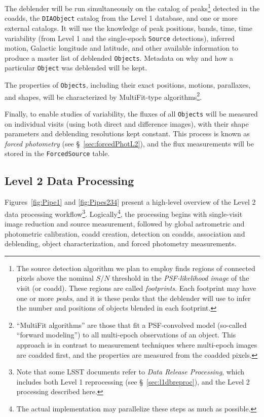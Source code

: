\documentclass[12pt]{article}
\newcommand{\code}[1]{\texttt{#1}}
\newcommand{\DIAObject}{\code{DIAObject}\xspace}
\newcommand{\DB}{{Level 1 database}\xspace}
\newcommand{\Object}{\code{Object}\xspace}
\newcommand{\Objects}{\code{Objects}\xspace}
\newcommand{\Source}{\code{Source}\xspace}
\newcommand{\ForcedSource}{\code{ForcedSource}\xspace}
\newcommand{\req}[1]{\marginpar{\tiny #1}}
\newcommand{\dmreq}[1]{\req{DMS-REQ-#1}}
\begin{document}
\dmreq{0275}
The deblender will be run simultaneously on the catalog of peaks\footnote{The source detection algorithm we plan to employ finds regions of connected pixels above the nominal $S/N$ threshold in the \emph{PSF-likelihood image} of the visit (or coadd). These regions are called \emph{footprints}. Each footprint may have one or more \emph{peaks}, and it is these peaks that the deblender will use to infer the number and positions of objects blended in each footprint.} detected in the coadds, the \DIAObject catalog from the \DB, and one or more external catalogs.  It will use the knowledge of peak positions, bands, time, time variability (from Level 1 and the single-epoch \Source detections), inferred motion, Galactic longitude and latitude, and other available information to produce a master list of deblended \Objects. Metadata on why and how a particular \Object was deblended will be kept.

\dmreq{0276}
The properties of \Objects, including their exact positions, motions, parallaxes, and shapes, will be characterized by MultiFit-type algorithms\footnote{``MultiFit algorithms'' are those that fit a PSF-convolved model (so-called ``forward modeling'')  to all multi-epoch observations of an object. This approach is in contrast to measurement techniques where multi-epoch images are coadded first, and the properties are measured from the coadded pixels.}.

Finally, to enable studies of variability, the fluxes of all \Objects will be measured on individual visits (using both
direct and difference images), with their shape parameters and deblending resolutions kept constant. This process is known as \emph{forced photometry} (see \S~\ref{sec:forcedPhotL2}), and the flux measurements will be stored in the \ForcedSource table.\dmreq{0268}

\subsection{Level 2 Data Processing}
\label{sec:level2dp}


Figures~\ref{fig:Pipe1} and \ref{fig:Pipes234}
present a high-level overview of the Level 2 data processing workflow\footnote{Note that some LSST documents refer to \emph{Data Release Processing}, which includes both Level 1 reprocessing (see \S~\ref{sec:l1dbreproc}), and the Level 2 processing described here.}. Logically\footnote{The actual implementation may parallelize these steps as much as possible.}, the processing begins with single-visit image reduction and source measurement, followed by global astrometric and photometric calibration, coadd creation, detection on coadds, association and deblending, object characterization, and forced photometry measurements.
\end{document}
